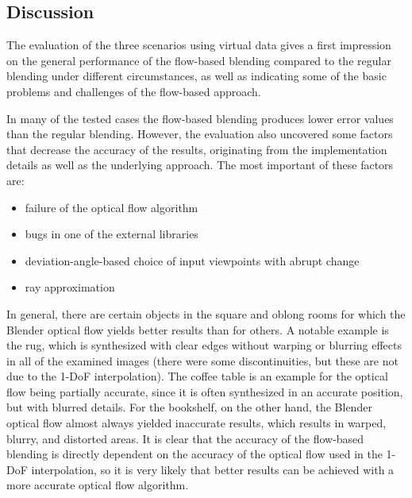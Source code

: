 \subsection{Discussion} \label{subsec:discussion_virtual}
The evaluation of the three scenarios using virtual data gives a first impression on the general performance of the flow-based blending compared to the regular blending under different circumstances, as well as indicating some of the basic problems and challenges of the flow-based approach.


In many of the tested cases the flow-based blending produces lower error values than the regular blending. However, the evaluation also uncovered some factors that decrease the accuracy of the results, originating from the implementation details as well as the underlying approach. The most important of these factors are:

\begin{itemize}
  \item failure of the optical flow algorithm
  \item bugs in one of the external libraries
  \item deviation-angle-based choice of input viewpoints with abrupt change
  \item ray approximation
\end{itemize}

In general, there are certain objects in the square and oblong rooms for which the Blender optical flow yields better results than for others. A notable example is the rug, which is synthesized with clear edges without warping or blurring effects in all of the examined images (there were some discontinuities, but these are not due to the 1-DoF interpolation). The coffee table is an example for the optical flow being partially accurate, since it is often synthesized in an accurate position, but with blurred details. For the bookshelf, on the other hand, the Blender optical flow almost always yielded inaccurate results, which results in warped, blurry, and distorted areas. It is clear that the accuracy of the flow-based blending is directly dependent on the accuracy of the optical flow used in the 1-DoF interpolation, so it is very likely that better results can be achieved with a more accurate optical flow algorithm.

